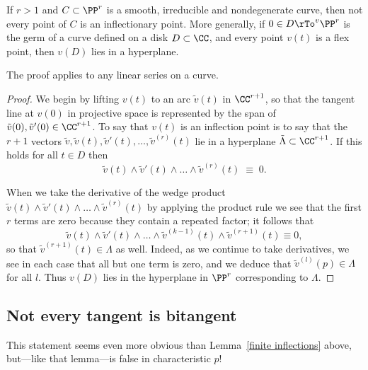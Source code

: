 \begin{lemma}\label{finite inflections}
If $r>1$ and $C \subset \PP^r$ is a smooth, irreducible and nondegenerate curve, then not every point of $C$ is an inflectionary point.
More generally, if $0\in D\rTo^v \PP^{r}$ is the germ of a curve defined on a disk $D\subset \CC$, and every point $v(t)$ is a flex point, then $v(D)$ lies in a hyperplane.
\end{lemma}

The proof applies to any linear series on a curve.

\begin{proof}
We begin by lifting $v(t)$ to an arc $\tilde v (t)$ in $\CC^{r+1}$, so that the tangent line at $v(0)$ in projective space
is represented by the span of $\tilde v(0), \tilde v'(0) \in \CC^{r+1}$. To say that $v(t)$ is an inflection point is to say that the 
$r+1$ vectors $\tilde v, \tilde v(t), \tilde v'(t), \dots,\tilde v^{(r)}(t)$ lie in a hyperplane $\tilde \Lambda \subset \CC^{r+1}$. If this holds for all $t \in D$ then
$$
\tilde v(t) \wedge \tilde v'(t) \wedge \dots \wedge \tilde v^{(r)}(t) \; \equiv \; 0.
$$

When we take the derivative of the wedge product $\tilde v(t) \wedge \tilde v'(t) \wedge \dots \wedge \tilde v^{(r)}(t)$ by applying the product rule we see that the first $r$ terms are zero because they contain a repeated factor; it follows that
$$
\tilde v(t) \wedge \tilde v'(t) \wedge \dots \wedge \tilde v^{(k-1)}(t)\wedge \tilde v^{(r+1)}(t) \equiv 0,
$$
so that $\tilde v^{(r+1)}(t) \in \Lambda$ as well. Indeed, as we continue to take derivatives, we see in each case that all but one term is zero, and we deduce that $\tilde v^{(l)}(p) \in \Lambda$ for all $l$. Thus $v(D)$  lies in the hyperplane in $\PP^r$ corresponding
to $\Lambda$.
\end{proof}

 \subsection{Not every tangent is bitangent}
 
 This statement seems even more obvious than Lemma~\ref{finite inflections} above, but---like that lemma---is false in characteristic $p$! 
 

